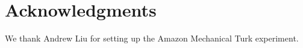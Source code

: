 \documentclass[letterpaper, 10 pt, conference]{ieeeconf}  %
\begin{document}
\section*{Acknowledgments}

We thank Andrew Liu for setting up the Amazon Mechanical Turk experiment.



\addtolength{\textheight}{-12cm}





\end{document}
